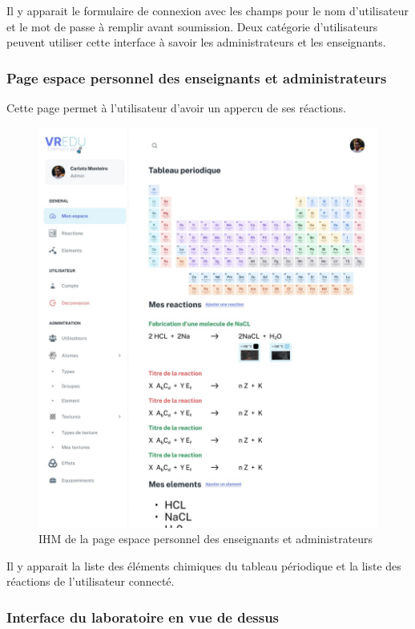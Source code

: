 Il y apparait le formulaire de connexion avec les champs pour le nom d'utilisateur et le mot de passe à remplir avant soumission.
Deux catégorie d'utilisateurs peuvent utiliser cette interface à savoir les administrateurs et les enseignants.

\subsubsection{Page espace personnel des enseignants et administrateurs}

Cette page permet à l'utilisateur d'avoir un appercu de ses réactions.

\begin{figure}[H]
	\centering
	\includegraphics[width=1\textwidth]{img/esp}
	\caption{IHM de la page espace personnel des enseignants et administrateurs}
	\label{fig:mesh1}
\end{figure}

Il y apparait la liste des éléments chimiques du tableau périodique et la liste des réactions de l'utilisateur connecté.

\subsubsection{Interface du laboratoire en vue de dessus}

